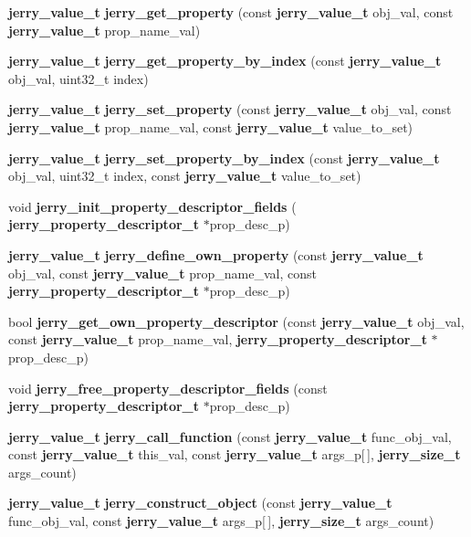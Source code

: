 \begin{DoxyCompactItemize}
\item 
\textbf{ jerry\+\_\+value\+\_\+t} {\bfseries jerry\+\_\+get\+\_\+property} (const \textbf{ jerry\+\_\+value\+\_\+t} obj\+\_\+val, const \textbf{ jerry\+\_\+value\+\_\+t} prop\+\_\+name\+\_\+val)
\item 
\textbf{ jerry\+\_\+value\+\_\+t} {\bfseries jerry\+\_\+get\+\_\+property\+\_\+by\+\_\+index} (const \textbf{ jerry\+\_\+value\+\_\+t} obj\+\_\+val, uint32\+\_\+t index)
\item 
\textbf{ jerry\+\_\+value\+\_\+t} {\bfseries jerry\+\_\+set\+\_\+property} (const \textbf{ jerry\+\_\+value\+\_\+t} obj\+\_\+val, const \textbf{ jerry\+\_\+value\+\_\+t} prop\+\_\+name\+\_\+val, const \textbf{ jerry\+\_\+value\+\_\+t} value\+\_\+to\+\_\+set)
\item 
\textbf{ jerry\+\_\+value\+\_\+t} {\bfseries jerry\+\_\+set\+\_\+property\+\_\+by\+\_\+index} (const \textbf{ jerry\+\_\+value\+\_\+t} obj\+\_\+val, uint32\+\_\+t index, const \textbf{ jerry\+\_\+value\+\_\+t} value\+\_\+to\+\_\+set)
\item 
void {\bfseries jerry\+\_\+init\+\_\+property\+\_\+descriptor\+\_\+fields} (\textbf{ jerry\+\_\+property\+\_\+descriptor\+\_\+t} $\ast$prop\+\_\+desc\+\_\+p)
\item 
\textbf{ jerry\+\_\+value\+\_\+t} {\bfseries jerry\+\_\+define\+\_\+own\+\_\+property} (const \textbf{ jerry\+\_\+value\+\_\+t} obj\+\_\+val, const \textbf{ jerry\+\_\+value\+\_\+t} prop\+\_\+name\+\_\+val, const \textbf{ jerry\+\_\+property\+\_\+descriptor\+\_\+t} $\ast$prop\+\_\+desc\+\_\+p)
\item 
bool {\bfseries jerry\+\_\+get\+\_\+own\+\_\+property\+\_\+descriptor} (const \textbf{ jerry\+\_\+value\+\_\+t} obj\+\_\+val, const \textbf{ jerry\+\_\+value\+\_\+t} prop\+\_\+name\+\_\+val, \textbf{ jerry\+\_\+property\+\_\+descriptor\+\_\+t} $\ast$prop\+\_\+desc\+\_\+p)
\item 
void {\bfseries jerry\+\_\+free\+\_\+property\+\_\+descriptor\+\_\+fields} (const \textbf{ jerry\+\_\+property\+\_\+descriptor\+\_\+t} $\ast$prop\+\_\+desc\+\_\+p)
\item 
\textbf{ jerry\+\_\+value\+\_\+t} {\bfseries jerry\+\_\+call\+\_\+function} (const \textbf{ jerry\+\_\+value\+\_\+t} func\+\_\+obj\+\_\+val, const \textbf{ jerry\+\_\+value\+\_\+t} this\+\_\+val, const \textbf{ jerry\+\_\+value\+\_\+t} args\+\_\+p[$\,$], \textbf{ jerry\+\_\+size\+\_\+t} args\+\_\+count)
\item 
\textbf{ jerry\+\_\+value\+\_\+t} {\bfseries jerry\+\_\+construct\+\_\+object} (const \textbf{ jerry\+\_\+value\+\_\+t} func\+\_\+obj\+\_\+val, const \textbf{ jerry\+\_\+value\+\_\+t} args\+\_\+p[$\,$], \textbf{ jerry\+\_\+size\+\_\+t} args\+\_\+count)

\end{DoxyCompactItemize}
